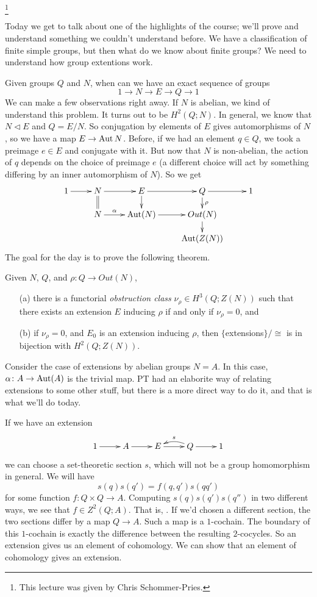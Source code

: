 \footnote{This lecture was given by Chris Schommer-Pries.}

Today we get to talk about one of the highlights of the course; we'll prove and understand something we couldn't understand before. We have a classification of finite simple groups, but then what do we know about finite groups? We need to understand how group extentions work.

Given groups $Q$ and $N$, when can we have an exact sequence of groups
\[
 1\to N\to E\to Q\to 1
\]
We can make a few observations right away. If $N$ is abelian, we kind of understand this problem. It turns out to be $H^2(Q;N)$. In general, we know that $N\triangleleft E$ and $Q=E/N$. So conjugation by elements of $E$ gives automorphisms of $N$, so we have a map $E\to \operatorname{Aut} N$. Before, if we had an element $q\in Q$, we took a preimage $e\in E$ and conjugate with it. But now that $N$ is non-abelian, the action of $q$ depends on the choice of preimage $e$ (a different choice will act by something differing by an inner automorphism of $N$). So we get
\[\xymatrix @R-1pc{
 1\ar[r] & N\ar[r] \ar@{=}[d] & E\ar[d]\ar[r] & Q\ar[r] \ar[d]^\rho & 1\\
 & N\ar[r]^-\alpha & \Aut(N)\ar[r] & Out(N) \ar[d]\\
 & & & \Aut(Z(N))
}\]
The goal for the day is to prove the following theorem.
\begin{theorem}
 Given $N$, $Q$, and $\rho\colon Q\to Out(N)$,
 \begin{itemize}
  \item[(a)] there is a functorial \emph{obstruction class} $\nu_\rho\in H^3(Q;Z(N))$ such that there exists an extension $E$ inducing $\rho$ if and only if $\nu_\rho=0$, and
  \item[(b)] if $\nu_\rho=0$, and $E_0$ is an extension inducing $\rho$, then $\{$extensions$\}/\cong$ is in bijection with $H^2(Q;Z(N))$.
 \end{itemize}
\end{theorem}
Consider the case of extensions by abelian groups $N=A$. In this case, $\alpha\colon A\to \operatorname{Aut}(A)$ is the trivial map. PT had an elaborite way of relating extensions to some other stuff, but there is a more direct way to do it, and that is what we'll do today.

If we have an extension
\[\xymatrix{
 1\ar[r] & A\ar[r] & E\ar[r] & Q\ar[r] \ar@/_/[l]_s & 1
}\]
we can choose a set-theoretic section $s$, which will not be a group homomorphism in general. We will have
\[
 s(q)s(q') = f(q,q')s(qq')
\]
for some function $f\colon Q\times Q\to A$. Computing $s(q)s(q')s(q'')$ in two different ways, we see that $f\in Z^2(Q;A)$. That is, . If we'd chosen a different section, the two sections differ by a map $Q\to A$. Such a map is a $1$-cochain. The boundary of this $1$-cochain is exactly the difference between the resulting $2$-cocycles. So an extension gives us an element of cohomology. We can show that an element of cohomology gives an extension.

